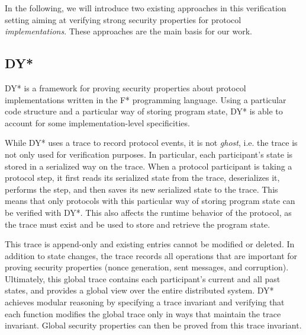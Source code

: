 In the following, we will introduce two existing approaches in this verification setting aiming at verifying strong security properties for protocol \emph{implementations}. These approaches are the main basis for our work.

\subsection{DY*}
\label{sec:dy-star}

DY*\cite{} is a framework for proving security properties about protocol implementations written in the F* programming language.
Using a particular code structure and a particular way of storing program state, DY* is able to account for some implementation-level specificities.

While DY* uses a trace to record protocol events, it is not \emph{ghost}, i.e. the trace is not only used for verification purposes.
In particular, each participant's state is stored in a serialized way on the trace.
When a protocol participant is taking a protocol step, it first reads its serialized state from the trace, deserializes it, performs the step, and then saves its new serialized state to the trace.
This means that only protocols with this particular way of storing program state can be verified with DY*.
This also affects the runtime behavior of the protocol, as the trace must exist and be used to store and retrieve the program state.

This trace is append-only and existing entries cannot be modified or deleted. In addition to state changes, the trace records all operations that are important for proving security properties (nonce generation, sent messages, and corruption).
Ultimately, this global trace contains each participant's current and all past states, and provides a global view over the entire distributed system. %
DY* achieves modular reasoning by specifying a trace invariant and verifying that each function modifies the global trace only in ways that maintain the trace invariant. Global security properties can then be proved from this trace invariant.

